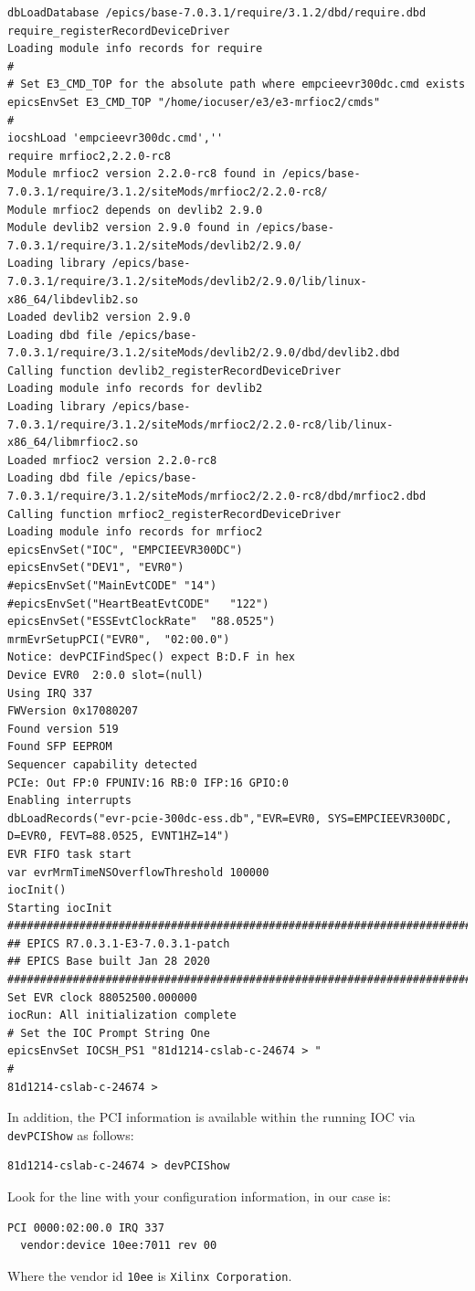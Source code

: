 \documentclass[11pt
  , a4paper
  , article
  , oneside
  , showtrims
]{memoir}
\begin{document}
{\begin{lstlisting}[style=termstyle]
dbLoadDatabase /epics/base-7.0.3.1/require/3.1.2/dbd/require.dbd
require_registerRecordDeviceDriver
Loading module info records for require
#
# Set E3_CMD_TOP for the absolute path where empcieevr300dc.cmd exists
epicsEnvSet E3_CMD_TOP "/home/iocuser/e3/e3-mrfioc2/cmds"
#
iocshLoad 'empcieevr300dc.cmd',''
require mrfioc2,2.2.0-rc8
Module mrfioc2 version 2.2.0-rc8 found in /epics/base-7.0.3.1/require/3.1.2/siteMods/mrfioc2/2.2.0-rc8/
Module mrfioc2 depends on devlib2 2.9.0
Module devlib2 version 2.9.0 found in /epics/base-7.0.3.1/require/3.1.2/siteMods/devlib2/2.9.0/
Loading library /epics/base-7.0.3.1/require/3.1.2/siteMods/devlib2/2.9.0/lib/linux-x86_64/libdevlib2.so
Loaded devlib2 version 2.9.0
Loading dbd file /epics/base-7.0.3.1/require/3.1.2/siteMods/devlib2/2.9.0/dbd/devlib2.dbd
Calling function devlib2_registerRecordDeviceDriver
Loading module info records for devlib2
Loading library /epics/base-7.0.3.1/require/3.1.2/siteMods/mrfioc2/2.2.0-rc8/lib/linux-x86_64/libmrfioc2.so
Loaded mrfioc2 version 2.2.0-rc8
Loading dbd file /epics/base-7.0.3.1/require/3.1.2/siteMods/mrfioc2/2.2.0-rc8/dbd/mrfioc2.dbd
Calling function mrfioc2_registerRecordDeviceDriver
Loading module info records for mrfioc2
epicsEnvSet("IOC", "EMPCIEEVR300DC")
epicsEnvSet("DEV1", "EVR0")
#epicsEnvSet("MainEvtCODE" "14")
#epicsEnvSet("HeartBeatEvtCODE"   "122")
epicsEnvSet("ESSEvtClockRate"  "88.0525")
mrmEvrSetupPCI("EVR0",  "02:00.0")
Notice: devPCIFindSpec() expect B:D.F in hex
Device EVR0  2:0.0 slot=(null)
Using IRQ 337
FWVersion 0x17080207
Found version 519
Found SFP EEPROM
Sequencer capability detected
PCIe: Out FP:0 FPUNIV:16 RB:0 IFP:16 GPIO:0
Enabling interrupts
dbLoadRecords("evr-pcie-300dc-ess.db","EVR=EVR0, SYS=EMPCIEEVR300DC, D=EVR0, FEVT=88.0525, EVNT1HZ=14")
EVR FIFO task start
var evrMrmTimeNSOverflowThreshold 100000
iocInit()
Starting iocInit
############################################################################
## EPICS R7.0.3.1-E3-7.0.3.1-patch
## EPICS Base built Jan 28 2020
############################################################################
Set EVR clock 88052500.000000
iocRun: All initialization complete
# Set the IOC Prompt String One
epicsEnvSet IOCSH_PS1 "81d1214-cslab-c-24674 > "
#
81d1214-cslab-c-24674 >
\end{lstlisting}

In addition, the PCI information is available within the running IOC via \texttt{devPCIShow} as follows:
\begin{lstlisting}
81d1214-cslab-c-24674 > devPCIShow
\end{lstlisting}
Look for the line with your configuration information, in our case is:
\begin{lstlisting}
PCI 0000:02:00.0 IRQ 337
  vendor:device 10ee:7011 rev 00
\end{lstlisting}
Where the vendor id \texttt{10ee} is \texttt{Xilinx Corporation}.\\

}
\end{document}

